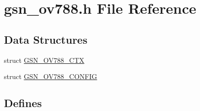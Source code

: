 \hypertarget{a00537}{
\section{gsn\_\-ov788.h File Reference}
\label{a00537}
}
\subsection*{Data Structures}
\begin{DoxyCompactItemize}
\item 
struct \hyperlink{a00179}{GSN\_\-OV788\_\-CTX}
\item 
struct \hyperlink{a00178}{GSN\_\-OV788\_\-CONFIG}
\end{DoxyCompactItemize}
\subsection*{Defines}
